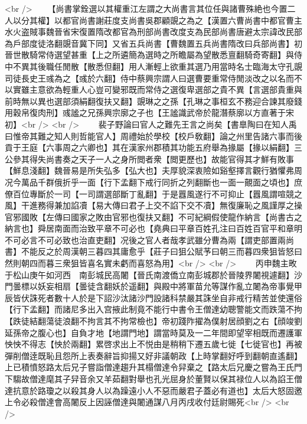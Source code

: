 <br />
　　【尚書掌銓選以其權重江左謂之大尚書言其位任與諸曹殊絶也今置二人以分其權】以都官尚書謝莊度支尚書吳郡顧覬之為之【漢置六曹尚書中都官曹主水火盗賊事魏晉省宋復置隋改都官為刑部尚書改度支為民部尚書唐避太宗諱改民部為戶部度徒洛翻覬音冀下同】又省五兵尚書【曹魏置五兵尚書隋改曰兵部尚書】初晉世散騎常侍選望甚重【上之所遴簡為選時之所瞻屬為望散悉亶翻騎奇寄翻】與侍中不異其後職任閒散【散悉但翻】用人漸輕上欲重其選乃用當時名士臨海太守孔覬司徒長史王彧為之【彧於六翻】侍中蔡興宗謂人曰選曹要重常侍閒淡改之以名而不以實雖主意欲為輕重人心豈可變邪既而常侍之選復卑選部之貴不異【言選部貴重與前時無以異也選部須絹翻復扶又翻】覬琳之之孫【孔琳之事桓玄不務迎合諫其廢錢用穀帛復肉刑】彧謐之兄孫興宗廓之子也【王謐識武帝於龍潛蔡廓以方直著于宋初】<br />
<br />
　　裴子野論曰官人之難先王言之尚矣【書臯陶曰在知人禹曰惟帝其難之知人則哲能官人】周禮始於學校【校戶敎翻】論之州里告諸六事而後貢于王庭【六事周之六卿也】其在漢家州郡積其功能五府舉為掾屬【掾以絹翻】三公參其得失尚書奏之天子一人之身所閲者衆【閲更歷也】故能官得其才鮮有敗事【鮮息淺翻】魏晉易是所失弘多【弘大也】夫厚貌深衷險如谿壑擇言觀行猶懼弗周况今萬品千群俄折乎一面【行下孟翻下戒行同折之列翻斷也一面一覿面之頃也】庶僚百位專斷於一司【一司謂選部斷丁亂翻】于是囂風遂行不可抑止【囂風謂喧競之風】干進務得兼加諂凟【易大傳曰君子上交不諂下交不凟】無復廉恥之風謹厚之操官邪國敗【左傳曰國家之敗由官邪也復扶又翻】不可紀綱假使龍作納言【尚書古之納言也】舜居南面而治致平章不可必也【堯典曰平章百姓孔注曰百姓百官平和章明不可必言不可必致也治直吏翻】况後之官人者哉孝武雖分曹為兩【謂吏部置兩尚書】不能反之於周漢朝三暮四其庸愈乎【莊子曰狙公賦芧曰朝三而暮四衆狙皆怒曰然則朝四而暮三衆狙皆喜名實未虧而喜怒為用】<br />
<br />
　　丙申魏主畋于松山庚午如河西　南彭城民高闍【晉氏南渡僑立南彭城郡於晉陵界闍視遽翻】沙門曇標以妖妄相扇【曇徒含翻妖於遥翻】與殿中將軍苗允等謀作亂立闍為帝事覺甲辰皆伏誅死者數十人於是下詔沙汰諸沙門設諸科禁嚴其誅坐自非戒行精苦並使還俗【行下孟翻】而諸尼多出入宫掖此制竟不能行中書令王僧達幼聰警能文而跌蕩不拘【跌徒結翻蕩徒浪翻不拘言其不拘常檢也】帝初踐阼擢為僕射居顔劉之右【顔竣劉延孫帝之腹心也】自負才地【地謂門地】謂當時莫及一二年間即望宰相既而遷護軍怏怏不得志【怏於兩翻】累啓求出上不悦由是稍稍下遷五歲七徙【七徙官也】再被彈削僧逹既恥且怨所上表奏辭旨抑揚又好非議朝政【上時掌翻好呼到翻朝直遙翻】上已積憤怒路太后兄子嘗詣僧達趨升其榻僧達令舁棄之【路太后兄慶之嘗為王氏門下騶故僧達麾其子舁音余又羊茹翻對舉也孔光屈身於董賢以保其禄位人以為諂王僧達抗意於路瓊之以殺其身人以為躁遠小人不惡而嚴君子蓋必有道也】太后大怒固邀上令必殺僧達會高闍反上因誣僧達與闍通謀八月丙戌收付廷尉賜死<br />
<br />
